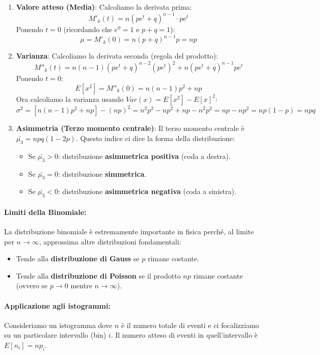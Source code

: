 \documentclass{article}
\theoremstyle{remark}
\begin{document}
\begin{enumerate}
    \item \textbf{Valore atteso (Media)}:
    Calcoliamo la derivata prima:
    \[ M'_k(t) = n(pe^t+q)^{n-1} \cdot pe^t \]
    Ponendo $t=0$ (ricordando che $e^0=1$ e $p+q=1$):
    \[ \mu = M'_k(0) = n(p+q)^{n-1}p = np \]

    \item \textbf{Varianza}:
    Calcoliamo la derivata seconda (regola del prodotto):
    \[ M''_k(t) = n(n-1)(pe^t+q)^{n-2}(pe^t)^2 + n(pe^t+q)^{n-1}pe^t \]
    Ponendo $t=0$:
    \[ E[x^2] = M''_k(0) = n(n-1)p^2 + np \]
    Ora calcoliamo la varianza usando $Var(x) = E[x^2] - E[x]^2$:
    \[
    \sigma^2 = [n(n-1)p^2 + np] - (np)^2 = n^2p^2 - np^2 + np - n^2p^2 = np - np^2 = np(1-p) = npq
    \]

    \item \textbf{Asimmetria (Terzo momento centrale)}:
    Il terzo momento centrale è $\bar{\mu_3} = npq(1-2p)$. Questo indice ci dice la forma della distribuzione:
    \begin{itemize}
        \item Se $\bar{\mu_3} > 0$: distribuzione \textbf{asimmetrica positiva} (coda a destra).
        \item Se $\bar{\mu_3} = 0$: distribuzione \textbf{simmetrica}.
        \item Se $\bar{\mu_3} < 0$: distribuzione \textbf{asimmetrica negativa} (coda a sinistra).
    \end{itemize}
\end{enumerate}

\vspace{0.5cm}

\paragraph{Limiti della Binomiale:}
La distribuzione binomiale è estremamente importante in fisica perché, al limite per $n \to \infty$, approssima altre distribuzioni fondamentali:
\begin{itemize}
    \item Tende alla \textbf{distribuzione di Gauss} se $p$ rimane costante.
    \item Tende alla \textbf{distribuzione di Poisson} se il prodotto $np$ rimane costante (ovvero se $p \to 0$ mentre $n \to \infty$).
\end{itemize}

\paragraph{Applicazione agli istogrammi:}
Consideriamo un istogramma dove $n$ è il numero totale di eventi e ci focalizziamo su un particolare intervallo (bin) $i$.
Il numero atteso di eventi in quell'intervallo è $E[n_i] = n p_i$.
\end{document}
